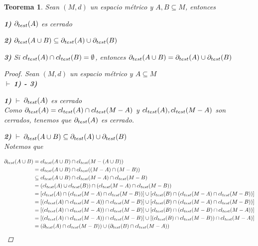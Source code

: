 \documentclass[oneside]{book} %
\theoremstyle{Teorema}
\newtheorem{Teorema}[Definicion]{Teorema}
\theoremstyle{Ejemplos}
\theoremstyle{[Obs]}
\def \test {test}
\newcommand{\cerradura}[2][\test]{\ifx \test #1 {\overline{#2}} \else {cl_{#1}(#2)} \fi} %
\newcommand{\frontera}[2][\test]{\ifx \test #1 {\partial(#2)} \else {\partial_{#1}(#2)} \fi} %
\renewcommand{\{}{\left\lbrace} %
\renewcommand{\}}{\right\rbrace} %
\renewcommand{\u}{\cup} %
\newcommand{\n}{\cap} %
\renewcommand{\sc}{\subseteq} %
\newcommand{\pd}{$\vdash\ $} %
\begin{document}
			\begin{Teorema}\setlength{\parindent}{0em}
				
				Sean $(M, d)$ un espacio métrico y $A, B \sc M$, entonces 

				\textbf{1)} $\frontera{A}$ es cerrado 

				\textbf{2)} $\frontera{A \u B} \sc \frontera{A} \u \frontera{B}$

				\textbf{3)} Si $\cerradura{A} \n \cerradura{B} = \emptyset$, entonces $\frontera{A \u B} = \frontera{A} \u \frontera{B}$

				\begin{proof}
					
					Sean $(M, d)$ un espacio métrico y $A \sc M$ \\ 
					\pd \textbf{1) - 3)}

					\textbf{1)} \pd $\frontera{A}$ es cerrado \\ 
					Como $\frontera{A} = \cerradura{A} \n \cerradura{M - A}$ y $\cerradura{A}, \cerradura{M - A}$ son cerrados, tenemos que $\frontera{A}$ es cerrado.

					\textbf{2)} \pd $\frontera{A \u B} \sc \frontera{A} \u \frontera{B}$ \\ 
					Notemos que
					
					\begin{align*}
						\frontera{A \u B} &= \cerradura{A \u B} \n \cerradura{M - (A \u B)} \\ 
						&= \cerradura{A \u B} \n \cerradura{(M - A) \n (M - B)} \\ 
						&\sc \cerradura{A \u B} \n \cerradura{M - A} \n \cerradura{M - B} \\
						&= (\cerradura{A} \u \cerradura{B}) \n (\cerradura{M - A} \n \cerradura{M - B}) \\ 
						&= [\cerradura{A} \n (\cerradura{M - A} \n \cerradura{M - B})] \u [\cerradura{B} \n (\cerradura{M - A} \n \cerradura{M - B})] \\ 
						&= [(\cerradura{A} \n \cerradura{M - A}) \n \cerradura{M - B}] \u [\cerradura{B} \n (\cerradura{M - A} \n \cerradura{M - B})] \\ 
						&= [(\cerradura{A} \n \cerradura{M - A}) \n \cerradura{M - B}] \u [\cerradura{B} \n (\cerradura{M - B} \n \cerradura{M - A})] \\ 
						&= [(\cerradura{A} \n \cerradura{M - A}) \n \cerradura{M - B}] \u [(\cerradura{B} \n \cerradura{M - B}) \n \cerradura{M - A}] \\ 
						&= (\frontera{A} \n \cerradura{M - B}) \u (\frontera{B} \n \cerradura{M - A}) 
					\end{align*}


\end{proof}
\end{Teorema}
\end{document}
